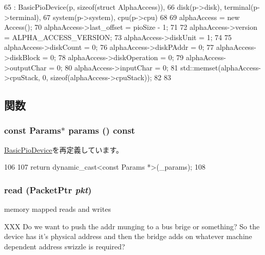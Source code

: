 \begin{DoxyCode}
65     : BasicPioDevice(p, sizeof(struct AlphaAccess)),
66       disk(p->disk), terminal(p->terminal),
67       system(p->system), cpu(p->cpu)
68 {
69     alphaAccess = new Access();
70     alphaAccess->last_offset = pioSize - 1;
71 
72     alphaAccess->version = ALPHA_ACCESS_VERSION;
73     alphaAccess->diskUnit = 1;
74 
75     alphaAccess->diskCount = 0;
76     alphaAccess->diskPAddr = 0;
77     alphaAccess->diskBlock = 0;
78     alphaAccess->diskOperation = 0;
79     alphaAccess->outputChar = 0;
80     alphaAccess->inputChar = 0;
81     std::memset(alphaAccess->cpuStack, 0, sizeof(alphaAccess->cpuStack));
82 
83 }
\end{DoxyCode}


\subsection{関数}
\hypertarget{classAlphaBackdoor_acd3c3feb78ae7a8f88fe0f110a718dff}{
\subsubsection[{params}]{\setlength{\rightskip}{0pt plus 5cm}const {\bf Params}$\ast$ params () const}}
\label{classAlphaBackdoor_acd3c3feb78ae7a8f88fe0f110a718dff}


\hyperlink{classBasicPioDevice_acd3c3feb78ae7a8f88fe0f110a718dff}{BasicPioDevice}を再定義しています。


\begin{DoxyCode}
106     {
107         return dynamic_cast<const Params *>(_params);
108     }
\end{DoxyCode}
\hypertarget{classAlphaBackdoor_a613ec7d5e1ec64f8d21fec78ae8e568e}{
\subsubsection[{read}]{ read ({\bf PacketPtr} {\em pkt})}}
\label{classAlphaBackdoor_a613ec7d5e1ec64f8d21fec78ae8e568e}
memory mapped reads and writes 

XXX Do we want to push the addr munging to a bus brige or something? So the device has it's physical address and then the bridge adds on whatever machine dependent address swizzle is required?

